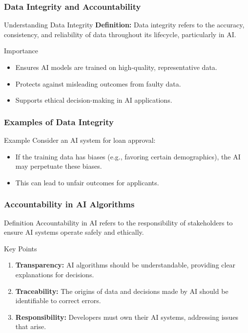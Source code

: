 \documentclass[aspectratio=169]{beamer}
\begin{document}
\begin{frame}[fragile]
    \frametitle{Data Integrity and Accountability}
    \begin{block}{Understanding Data Integrity}
        \textbf{Definition:}
        Data integrity refers to the accuracy, consistency, and reliability of data throughout its lifecycle, particularly in AI.
    \end{block}
    \begin{block}{Importance}
        \begin{itemize}
            \item Ensures AI models are trained on high-quality, representative data.
            \item Protects against misleading outcomes from faulty data.
            \item Supports ethical decision-making in AI applications.
        \end{itemize}
    \end{block}
\end{frame}

\begin{frame}[fragile]
    \frametitle{Examples of Data Integrity}
    \begin{block}{Example}
       Consider an AI system for loan approval:
       \begin{itemize}
           \item If the training data has biases (e.g., favoring certain demographics), the AI may perpetuate these biases.
           \item This can lead to unfair outcomes for applicants.
       \end{itemize}
    \end{block}
\end{frame}

\begin{frame}[fragile]
    \frametitle{Accountability in AI Algorithms}
    \begin{block}{Definition}
        Accountability in AI refers to the responsibility of stakeholders to ensure AI systems operate safely and ethically.
    \end{block}
    \begin{block}{Key Points}
        \begin{enumerate}
            \item \textbf{Transparency:} AI algorithms should be understandable, providing clear explanations for decisions.
            \item \textbf{Traceability:} The origins of data and decisions made by AI should be identifiable to correct errors.
            \item \textbf{Responsibility:} Developers must own their AI systems, addressing issues that arise.
        \end{enumerate}
    \end{block}
\end{frame}
\end{document}
